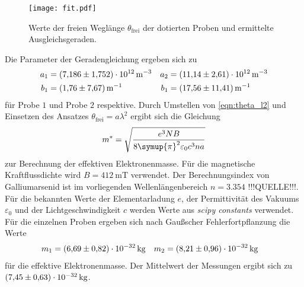 \begin{figure}
  \centering
  \texttt{[image: fit.pdf]}
  \caption{Werte der freien Weglänge $\theta_\text{frei}$ der dotierten Proben und ermittelte Ausgleichsgeraden.}
  \label{fig:fit}
\end{figure}

Die Parameter der Geradengleichung ergeben sich zu
\begin{align*}
  a_1 &= \qty{7.186+-1.752e12}{\metre^{-3}} &  a_2 &= \qty{11.14+-2.61e12}{\metre^{-3}} \\
  b_1 &= \qty{1.76+-7.67}{\metre^{-1}} & b_1 &= \qty{17.56+-11.41}{\metre^{-1}}
\end{align*}
für Probe $1$ und Probe $2$ respektive. Durch Umstellen von \autoref{eqn:theta_l2} und Einsetzen des Ansatzes $\theta_\text{frei} = a \lambda^2$ ergibt sich 
die Gleichung
\begin{equation}
  m^* = \sqrt{\frac{e^3 N B}{8 \symup{\pi}^2 \varepsilon_0 c^3 n a}}
\end{equation}
zur Berechnung der effektiven Elektronenmasse. Für die magnetische Kraftflussdichte wird $B = \qty{412}{\milli\tesla}$ verwendet. Der Berechnungsindex von Galliumarsenid ist
im vorliegenden Wellenlängenbereich $n = \num{3.354}$ !!!QUELLE!!!. Für die bekannten Werte der Elementarladung $e$, der Permittivität des Vakuums $\varepsilon_0$ und der 
Lichtgeschwindigkeit $c$ werden Werte aus \textit{scipy constants} \cite{scipy} verwendet. Für die einzelnen Proben ergeben sich nach Gaußscher Fehlerfortpflanzung 
die Werte
\begin{align*}
  m_1 &= \qty{6.69+-0.82e-32}{\kilo\gram} & m_2 &=  \qty{8.21+-0.96e-32}{\kilo\gram}
\end{align*}
für die effektive Elektronenmasse. Der Mittelwert der Messungen ergibt sich zu $\qty{7.45+-0.63e-32}{\kilo\gram}$.
